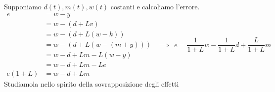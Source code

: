 Supponiamo $d(t) ,m(t) ,w(t)$ costanti e calcoliamo l'errore.
\begin{equation*}
	\begin{aligned}
		e      & =w-y              \\
		       & =w-(d+Lv)         \\
		       & =w-(d+L(w-k))     \\
		       & =w-(d+L(w-(m+y))) \\
		       & =w-d+Lm-L(w-y)    \\
		       & =w-d+Lm-Le        \\
		e(1+L) & =w-d+Lm           
	\end{aligned} \ \ \implies \ \ \boxed{e=\frac{1}{1+L} w-\frac{1}{1+L} d+\frac{L}{1+L} m}
\end{equation*}
Studiamola nello spirito della sovrapposizione degli effetti

